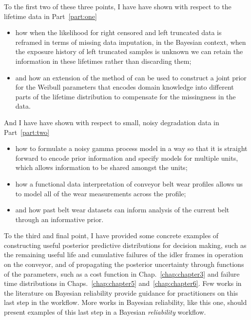 To the first two of these three points, I have have shown with respect to the lifetime data in Part~\ref{part:one} 
\begin{itemize}
  \item how when the likelihood for right censored and left truncated data is reframed in terms of missing data imputation, in the Bayesian context, when the exposure history of left truncated samples is unknown we can retain the information in these lifetimes rather than discarding them;
  \item and how an extension of the method of \citet{kaminskiy2005} can be used to construct a joint prior for the Weibull parameters that encodes domain knowledge into different parts of the lifetime distribution to compensate for the missingness in the data.
\end{itemize}
And I have have shown with respect to small, noisy degradation data in Part~\ref{part:two}
\begin{itemize}
  \item how to formulate a noisy gamma process model in a way so that it is straight forward to encode prior information and specify models for multiple units, which allows information to be shared amongst the units;
  \item how a functional data interpretation of conveyor belt wear profiles allows us to model all of the wear measurements across the profile;
  \item and how past belt wear datasets can inform analysis of the current belt through an informative prior.
\end{itemize}
To the third and final point, I have provided some concrete examples of constructing useful posterior predictive distributions for decision making, such as the remaining useful life and cumulative failures of the idler frames in operation on the conveyor, and of propagating the posterior uncertainty through functions of the parameters, such as a cost function in Chap.~\ref{chap:chapter3} and failure time distributions in Chaps.~\ref{chap:chapter5} and~\ref{chap:chapter6}. Few works in the literature on Bayesian reliability provide guidance for practitioners on this last step in the workflow. More works in Bayesian reliability, like this one, should present examples of this last step in a Bayesian \emph{reliability} workflow.
